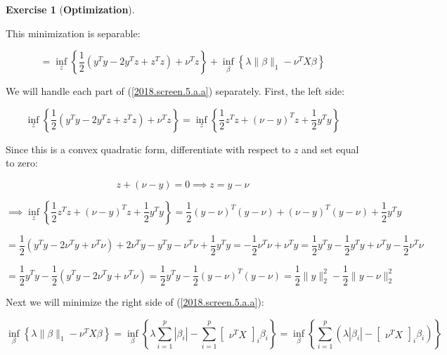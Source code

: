 \documentclass{article}
\theoremstyle{definition}
\newtheorem{exercise}{Exercise}
\theoremstyle{definition}
\theoremstyle{definition}
\theoremstyle{definition}
\begin{document}
\begin{exercise}[\textbf{Optimization}]
\begin{enumerate}[(a)]
This minimization is separable:

\begin{equation}\label{2018.screen.5.a.a}
= \inf_{z} \left\{\frac{1}{2} \left(y^Ty - 2 y^Tz + z^Tz \right) + \nu^T z \right\} + \inf_{\beta} \left\{ \lambda \lVert \beta \rVert_1  - \nu^T X \beta  \right\}
\end{equation}

We will handle each part of (\ref{2018.screen.5.a.a}) separately. First, the left side:

\[
 \inf_{z} \left\{\frac{1}{2} \left(y^Ty - 2 y^Tz + z^Tz \right) + \nu^T z \right\} = \inf_{z} \left\{\frac{1}{2}z^Tz  + (\nu - y)^Tz + \frac{1}{2} y^Ty   \right\} 
\]

Since this is a convex quadratic form, differentiate with respect to \(z\) and set equal to zero:

\begin{equation}\label{other.part.result}
z + (\nu - y) = 0 \implies z = y - \nu
\end{equation}

\[
 \implies \inf_{z} \left\{\frac{1}{2}z^Tz  + (\nu - y)^Tz + \frac{1}{2} y^Ty   \right\} =  \frac{1}{2}(y - \nu) ^T(y - \nu)  + (\nu - y)^T(y - \nu) + \frac{1}{2} y^Ty 
\]

\[
=  \frac{1}{2}\left(y^Ty -2 \nu^Ty + \nu^T\nu \right)  + 2\nu^Ty - y^Ty - \nu^T\nu + \frac{1}{2} y^Ty  = -\frac{1}{2}\nu^T\nu   + \nu^Ty = \frac{1}{2} y^Ty - \frac{1}{2}y^Ty  + \nu^Ty - \frac{1}{2} \nu^T\nu 
\]

\[
= \frac{1}{2} y^Ty - \frac{1}{2}(y^Ty - 2\nu^Ty + \nu^T\nu ) = \frac{1}{2} y^Ty - \frac{1}{2}(y - \nu)^T(y - \nu)= \frac{1}{2} \lVert y \rVert_2^2 - \frac{1}{2} \lVert y - \nu \rVert_2^2 
\]

Next we will minimize the right side of (\ref{2018.screen.5.a.a}):

\[
 \inf_{\beta} \left\{ \lambda \lVert \beta \rVert_1  - \nu^T X \beta  \right\} =  \inf_{\beta} \left\{ \lambda \sum_{i=1}^p | \beta_i| - \sum_{i=1}^p \begin{bmatrix} \nu^T X \end{bmatrix}_i  \beta_i  \right\}  =  \inf_{\beta} \left\{ \sum_{i=1}^p  \left( \lambda  | \beta_i| -  \begin{bmatrix} \nu^T X \end{bmatrix}_i  \beta_i \right)  \right\} 
 \]
 
 

\end{enumerate}
\end{exercise}
\end{document}
